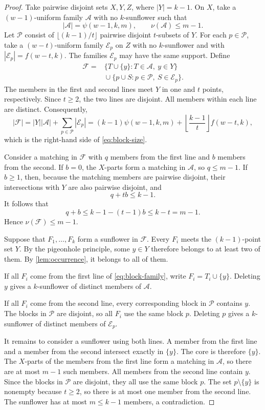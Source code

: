 \documentclass[11pt]{article}
\numberwithin{equation}{section}
\theoremstyle{definition}
\theoremstyle{remark}
\newcommand{\F}{\mathcal F}
\newcommand{\A}{\mathcal A}
\newcommand{\E}{\mathcal E}
\begin{document}
\begin{proof}
Take pairwise disjoint sets $X,Y,Z$, where $|Y|=k-1$. On $X$, take a
$(w-1)$-uniform family $\A$ with no $k$-sunflower such that
\[
 |\A|=\psi(w-1,k,m),
 \qquad
 \nu(\A)\le m-1.
\]
Let $\mathcal P$ consist of $\lfloor(k-1)/t\rfloor$ pairwise disjoint
$t$-subsets of $Y$. For each $p\in\mathcal P$, take a
$(w-t)$-uniform family $\E_p$ on $Z$ with no $k$-sunflower and with
$|\E_p|=f(w-t,k)$. The families $\E_p$ may have the same support. Define
\begin{equation}
\begin{split}
 \F={}&\{T\cup\{y\}:T\in\A,\ y\in Y\}\\
 &{}\cup\{p\cup S:p\in\mathcal P,\ S\in\E_p\}.
\end{split}
\label{eq:block-family}
\end{equation}
The members in the first and second lines meet $Y$ in one and $t$ points,
respectively. Since $t\ge2$, the two lines are disjoint. All members within
each line are distinct. Consequently,
\[
 |\F|
 =|Y||\A|+\sum_{p\in\mathcal P}|\E_p|
 =(k-1)\psi(w-1,k,m)
   +\left\lfloor\frac{k-1}{t}\right\rfloor f(w-t,k),
\]
which is the right-hand side of \cref{eq:block-size}.

Consider a matching in $\F$ with $q$ members from the first line and $b$
members from the second. If $b=0$, the $X$-parts form a matching in $\A$, so
$q\le m-1$. If $b\ge1$, then, because the matching members are pairwise
disjoint, their intersections with $Y$ are also pairwise disjoint, and
\[
 q+tb\le k-1.
\]
It follows that
\[
 q+b\le k-1-(t-1)b\le k-t=m-1.
\]
Hence $\nu(\F)\le m-1$.

Suppose that $F_1,\ldots,F_k$ form a sunflower in $\F$. Every $F_i$ meets
the $(k-1)$-point set $Y$. By the pigeonhole principle, some $y\in Y$
therefore belongs to at least two of them. By \cref{lem:occurrence}, it
belongs to all of them.

If all $F_i$ come from the first line of \cref{eq:block-family}, write
$F_i=T_i\cup\{y\}$. Deleting $y$ gives a $k$-sunflower of distinct members
of $\A$.

If all $F_i$ come from the second line, every corresponding block in
$\mathcal P$ contains $y$. The blocks in $\mathcal P$ are disjoint, so all
$F_i$ use the same block $p$. Deleting $p$ gives a $k$-sunflower of distinct
members of $\E_p$.

It remains to consider a sunflower using both lines. A member from the first
line and a member from the second intersect exactly in $\{y\}$. The core is
therefore $\{y\}$. The $X$-parts of the members from the first line form a
matching in $\A$, so there are at most $m-1$ such members. All members from
the second line contain $y$. Since the blocks in $\mathcal P$ are disjoint,
they all use the same block $p$. The set $p\setminus\{y\}$ is nonempty
because $t\ge2$, so there is at most one member from the second line. The
sunflower has at most $m\le k-1$ members, a contradiction.
\end{proof}
\end{document}

